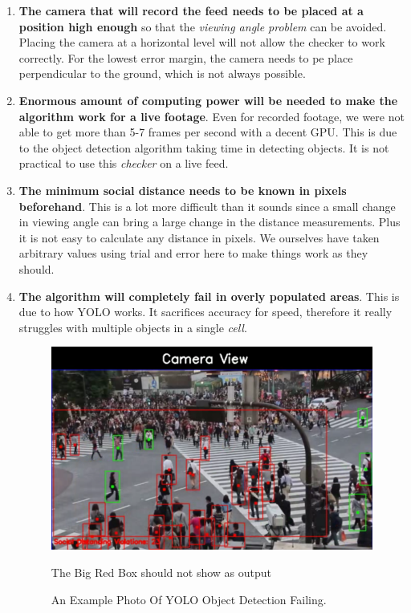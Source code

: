 \documentclass[a4paper]{article}
\begin{document}
\begin{enumerate}
    \item \textbf{The camera that will record the feed needs to be placed at a position high enough} so that the \textit{viewing angle problem} can be avoided. Placing the camera at a horizontal level will not allow the checker to work correctly. For the lowest error margin, the camera needs to pe place perpendicular to the ground, which is not always possible.
    \item \textbf{Enormous amount of computing power will be needed to make the algorithm work for a live footage}. Even for recorded footage, we were not able to get more than 5-7 frames per second with a decent GPU. This is due to the object detection algorithm taking time in detecting objects. It is not practical to use this \textit{checker} on a live feed.
    \item \textbf{The minimum social distance needs to be known in pixels beforehand}. This is a lot more difficult than it sounds since a small change in viewing angle can bring a large change in the distance measurements. Plus it is not easy to calculate any distance in pixels. We ourselves have taken arbitrary values using trial and error here to make things work as they should.
    \item \textbf{The algorithm will completely fail in overly populated areas}. This is due to how YOLO works. It sacrifices accuracy for speed, therefore it really struggles with multiple objects in a single \textit{cell}.
    \begin{figure}[h]
        \centering
        \includegraphics[width=0.8\linewidth]{Pictures/shibuya_bad_frame.png}
        \caption{An Example Photo Of YOLO Object Detection Failing.}{The Big Red Box should not show as output}
        \label{fig:shibuyaFail}
    \end{figure}
\end{enumerate}
\end{document}
